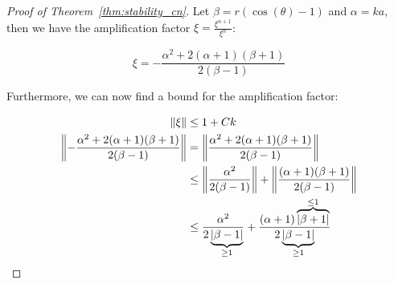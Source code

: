 \begin{proof}[Proof of Theorem~\ref{thm:stability_cn}]
  Let \(\beta = r(\cos(\theta) - 1)\) and \(\alpha = ka\), then we have the amplification factor \(\xi=\frac{\xi^{n+1}}{\xi^n}\):

  \[
    \xi = -\frac{\alpha^2 + 2(\alpha + 1)(\beta + 1)}{2(\beta - 1)}
  \]

  Furthermore, we can now find a bound for the amplification factor:

  \begin{align*}
    \norm*{\xi}                                                       & \leq 1 + Ck                                                                                                                                                    \\
    \norm*{-\frac{\alpha^2 + 2(\alpha + 1)(\beta + 1)}{2(\beta - 1)}} & = \norm*{\frac{\alpha^2 + 2(\alpha + 1)(\beta + 1)}{2(\beta - 1)}}                                                                                             \\
                                                                      & \leq \norm*{\frac{\alpha^2}{2(\beta - 1)}} + \norm*{\frac{(\alpha + 1)(\beta + 1)}{2(\beta - 1)}}                                                              \\
                                                                      & \leq \frac{\alpha^2}{2\underbrace{\abs{\beta - 1}}_{\geq 1}} + \frac{(\alpha + 1)\overbrace{\abs{\beta + 1}}^{\leq 1}}{2\underbrace{\abs{\beta - 1}}_{\geq 1}} \\
  \end{align*}
\end{proof}


